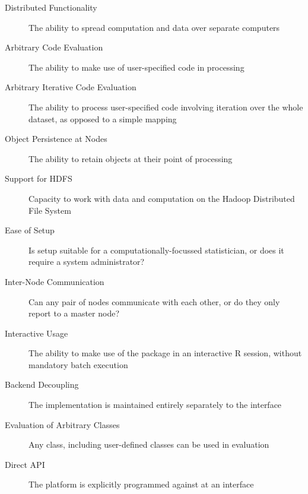 \documentclass[a4paper,10pt]{article}
\begin{document}
\begin{description}
	\item[Distributed Functionality] The ability to spread computation and data
	      over separate computers
	\item[Arbitrary Code Evaluation] The ability to make use of user-specified code
	      in processing
	\item[Arbitrary Iterative Code Evaluation] The ability to process
	      user-specified code involving iteration over the whole dataset, as opposed to a
	      simple mapping
	\item[Object Persistence at Nodes] The ability to retain objects at their point
	      of processing
	\item[Support for HDFS] Capacity to work with data and computation on the
	      Hadoop Distributed File System
	\item[Ease of Setup] Is setup suitable for a computationally-focussed
	      statistician, or does it require a system administrator?
	\item[Inter-Node Communication] Can any pair of nodes communicate with each
	      other, or do they only report to a master node?
	\item[Interactive Usage] The ability to make use of the package in an
	      interactive R session, without mandatory batch execution
	\item[Backend Decoupling] The implementation is maintained entirely separately
	      to the interface
	\item[Evaluation of Arbitrary Classes] Any class, including user-defined
	      classes can be used in evaluation
	\item[Direct API] The platform is explicitly programmed against at an interface

\end{description}
\end{document}

